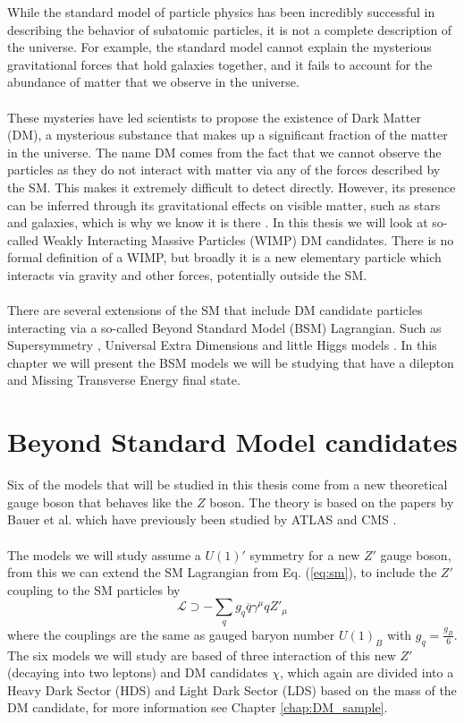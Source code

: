 \documentclass[12pt, a4paper]{book}
\begin{document}
While the standard model of particle physics has been incredibly successful in describing the behavior of subatomic particles, it is not a complete description of the universe. For example, the standard model cannot explain the mysterious gravitational forces that hold galaxies together, 
and it fails to account for the abundance of matter that we observe in the universe.\\
\\These mysteries have led scientists to propose the existence of Dark Matter (DM), a mysterious substance that makes up a significant fraction of the matter in the universe. The name DM comes from the fact that we cannot observe the particles as they do not interact with matter via any of the 
forces described by the SM. This makes it extremely difficult to detect directly. However, its presence can be inferred through its gravitational effects on visible matter, such as stars and galaxies, which is why we know it is there \cite{DM1, DM2}. In this thesis we will look at so-called 
Weakly Interacting Massive Particles (WIMP) DM candidates. There is no formal definition of a WIMP, but broadly it is a new elementary particle which interacts via gravity and other forces, potentially outside the SM.\\
\\There are several extensions of the SM that include DM candidate particles interacting via a so-called Beyond Standard Model (BSM) Lagrangian. Such as Supersymmetry \cite{JUNGMAN1996195},  Universal Extra Dimensions \cite{DIENES199947} and little Higgs models \cite{ARKANIHAMED2001232}. 
In this chapter we will present the BSM models we will be studying that have a dilepton and Missing Transverse Energy final state.

\section{Beyond Standard Model candidates}
Six of the models that will be studied in this thesis come from a new theoretical gauge boson that behaves like the $Z$ boson. The theory is based on the papers by Bauer et al. \cite{ Zp_DM_candidate2} which have previously been studied by ATLAS \cite{Zp_DM_candidate3} and CMS \cite{Zp_DM_candidate1}. \\
\\The models we will study assume a $U(1)'$ symmetry for a new $Z'$ gauge boson, from this we can extend the SM Lagrangian from Eq. (\ref{eq:sm}), to include the $Z'$ coupling to the SM particles by
\begin{equation}\label{eq:Zpq}
    \mathcal{L}\supset -\sum_q g_q \overline{q}\gamma^\mu q Z'_\mu
\end{equation}
where the couplings are the same as gauged baryon number $U(1)_B$ with $g_q=\frac{g_B}{6}$. The six models we will study are based of three interaction of this new $Z'$ (decaying into two leptons) and DM candidates $\chi$, which again are divided into a Heavy Dark Sector (HDS) and Light Dark Sector (LDS) based on the mass of 
the DM candidate, for more information see Chapter \ref{chap:DM_sample}.
\end{document}
